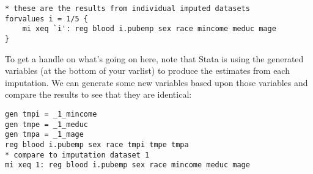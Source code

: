\documentclass[a4paper,12pt]{article}
\begin{document}
\begin{enumerate}
\begin{verbatim}
* these are the results from individual imputed datasets
forvalues i = 1/5 {
	mi xeq `i': reg blood i.pubemp sex race mincome meduc mage
}
\end{verbatim}

To get a handle on what's going on here, note that Stata is using the generated variables (at the bottom of your varlist) to produce the estimates from each imputation. We can generate some new variables based upon those variables and compare the results to see that they are identical:

\begin{verbatim}
gen tmpi = _1_mincome
gen tmpe = _1_meduc
gen tmpa = _1_mage
reg blood i.pubemp sex race tmpi tmpe tmpa
* compare to imputation dataset 1
mi xeq 1: reg blood i.pubemp sex race mincome meduc mage
\end{verbatim}



\end{enumerate}
\end{document}

